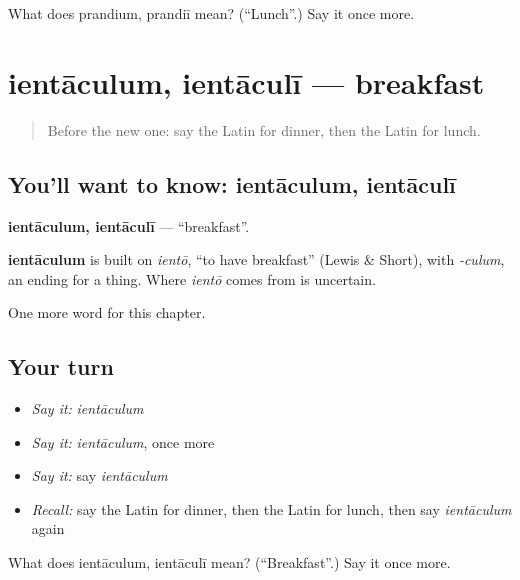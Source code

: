 \begin{tcolorbox}[breakable,colback=teal!4,colframe=teal!35!black,title={Before you move on}]
What does prandium, prandiī mean? (\textquotedblleft{}Lunch\textquotedblright{}.) Say it once more.
\end{tcolorbox}
\section[ientāculum, ientāculī]{ientāculum, ientāculī — breakfast}

\label{lesson:LA-C79-ientaculum}



\begin{quote}
Before the new one: say the Latin for dinner, then the Latin for lunch.
\end{quote}

\subsection*{You'll want to know: ientāculum, ientāculī}
\textbf{ientāculum, ientāculī} — \textquotedblleft{}breakfast\textquotedblright{}.

\begin{cousinweb}
\textbf{ientāculum} is built on \emph{ientō}, \textquotedblleft{}to have breakfast\textquotedblright{} (Lewis \& Short), with \emph{-culum}, an ending for a thing. Where \emph{ientō} comes from is uncertain.
\end{cousinweb}

\begin{grammarlens}[title={What you've built}]
One more word for this chapter.
\end{grammarlens}

\subsection*{Your turn}
\begin{itemize}
\raggedright
  \item \emph{Say it:} \emph{ientāculum}
  \item \emph{Say it:} \emph{ientāculum}, once more
  \item \emph{Say it:} say \emph{ientāculum}
  \item \emph{Recall:} say the Latin for dinner, then the Latin for lunch, then say \emph{ientāculum} again
\end{itemize}

\begin{tcolorbox}[breakable,colback=teal!4,colframe=teal!35!black,title={Before you move on}]
What does ientāculum, ientāculī mean? (\textquotedblleft{}Breakfast\textquotedblright{}.) Say it once more.
\end{tcolorbox}
